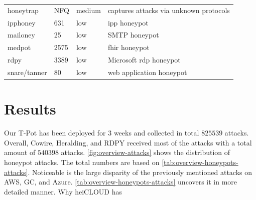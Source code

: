 \begin{table}
\begin{tabularx}{\linewidth}{l|XlX}
        honeytrap \cite{honeytrap2021}           & NFQ                                                                                                         & medium                     & captures attacks via unknown protocols                                               \\
        ipphoney \cite{ipphoney2021}             & 631                                                                                                         & low                        & \ac{ipp} honeypot                                                                    \\
        mailoney                                 & 25                                                                                                          & low                        & SMTP honeypot                                                                        \\
        medpot \cite{medpot2021}                 & 2575                                                                                                        & low                        & \ac{fhir} honeypot                                                                   \\
        rdpy \cite{rdpy2021}                     & 3389                                                                                                        & low                        & Microsoft \ac{rdp} honeypot                                                          \\
        snare/tanner \cite{snare2021}            & 80                                                                                                          & low                        & web application honeypot                                                             \\
        \bottomrule
    \end{tabularx}
    \label{tab:overview-honeypots}
\end{table}

\section{Results}
\label{sec:honeypots-heicloud}

Our T-Pot has been deployed for 3 weeks and collected in total $825539$ attacks.
Overall, Cowire, Heralding, and RDPY received most of the attacks with a total amount of $540398$ attacks.
\autoref{fig:overview-attacks} shows the distribution of honeypot attacks.
The total numbers are based on \autoref{tab:overview-honeypots-attacks}.
Noticeable is the large disparity of the previously mentioned attacks on AWS, GC, and Azure.
\autoref{tab:overview-honeypots-attacks} uncovers it in more detailed manner.
Why heiCLOUD has

